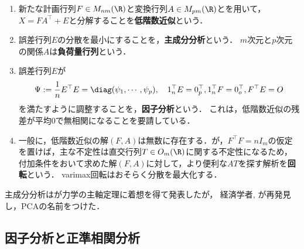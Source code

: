 \documentclass[uplatex,dvipdfmx]{jsreport}
\begin{document}
\begin{definition}[PCA, FA]\mbox{}
    \begin{enumerate}
        \item 新たな計画行列$F\in M_{nm}(\R)$と変換行列$A\in M_{pm}(\R)$とを用いて，$X=FA^\top+E$と分解することを\textbf{低階数近似}という．
        \item 誤差行列$E$の分散を最小にすることを，\textbf{主成分分析}という．
        $m$次元と$p$次元の関係$A$は\textbf{負荷量行列}という．
        \item 誤差行列$E$が
        \[\Psi:=\frac{1}{n}E^\top E=\diag(\psi_1,\cdots,\psi_p),\quad 1_n^\top E=0_p^\top,1^\top_nF=0^\top_o,F^\top E=O\]
        を満たすように調整することを，\textbf{因子分析}という．
        これは，低階数近似の残差が平均$0$で無相関になることを要請している．
        \item 一般に，低階数近似の解$(F,A)$は無数に存在する．が，$F^\top F=nI_m$の仮定を置けば，主な不定性は直交行列$T\in O_m(\R)$に関する不定性になるため，付加条件をおいて求めた解$(F,A)$に対して，より便利な$AT$を探す解析を\textbf{回転}という．
        varimax回転はおそらく分散を最大化する．
    \end{enumerate}
\end{definition}

\begin{history}
    主成分分析は\cite{Pearson01-PCA}が力学の主軸定理に着想を得て発表したが，
    経済学者\cite{Hotelling35}, \cite{Hotelling36}が再発見し，PCAの名前をつけた．
\end{history}


\subsection{因子分析と正準相関分析}
\end{document}

